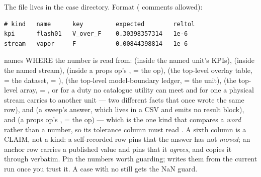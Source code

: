 \documentclass[11pt,a4paper]{article}
\begin{document}
\begin{keyidea}
The  file lives in the case directory.  Format
(\code{\#} comments allowed):
\begin{lstlisting}
# kind   name      key         expected        reltol
kpi      flash01   V_over_F    0.30398357314   1e-6
stream   vapor     F           0.00844398814   1e-6
\end{lstlisting}
 names WHERE the number is read from:  (inside the
named unit's KPIs),  (inside the named stream),
 (inside a props op's ,
 = the op),  (the top-level 
overlay table,  = the dataset,  =
),  (the top-level
 model-boundary ledger,  = the unit),
 (the top-level  array,
 = , or
 for a duty no catalogue utility can meet
and  for one a physical stream carries to
another unit --- two different facts that once wrote the same row), and
 (a sweep's answer, which lives in a CSV and emits no result
block), and  (a props op's
,  = the op) --- which is
the one kind that compares a \emph{word} rather than a number, so its
tolerance column must read .  A sixth column  is a CLAIM, not a kind: a
self-recorded row pins that the answer has not \emph{moved}; an anchor
row carries a published value and pins that it \emph{agrees}, and
 copies it through verbatim.  Pin the numbers worth
guarding;  writes them from the current run once you trust
it.  A case with no  still gets the NaN guard.


\end{keyidea}
\end{document}

